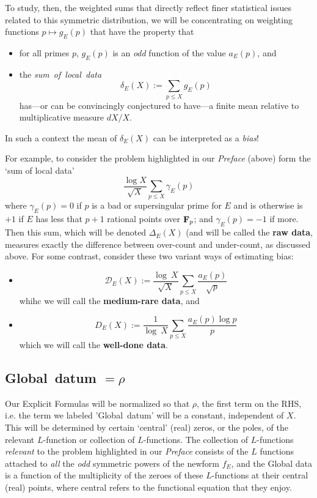 \documentclass[11pt]{article}
\theoremstyle{plain}
\theoremstyle{definition}
\numberwithin{equation}{section}
\numberwithin{figure}{section}
\numberwithin{table}{section}
\begin{document}
\vskip20pt
  To study, then, the weighted sums that directly reflect finer statistical issues related to this symmetric distribution, we will be concentrating on weighting functions $p \mapsto g_E(p)$ that have the property that \begin{itemize} \item for all primes $p$, $g_E(p)$ is an {\it odd} function of the value  $a_E(p)$, and \item the {\it sum\ of\ local\ data}  $$\delta_E(X):=\sum_{p\le X}g_E(p)$$ has---or can be convincingly conjectured to have---a finite mean  %
    relative to multiplicative measure $dX/X$.\end{itemize}  In such a context  the mean of $\delta_E(X)$ can be interpreted as a {\it bias}!


 For example, to consider  the problem highlighted in our {\it Preface} (above) form  the `sum of local data'
  $${\frac{\log X}{{\sqrt X}}}\sum_{p\le X}\gamma_E(p)$$  where $\gamma_E(p)=0$ if $p$ is a bad or supersingular prime for $E$ and is otherwise is $+1$ if $E$ has less that $p+1$ rational points over ${\bf F}_p$; and $\gamma_E(p) = -1$ if more.  Then this sum, which will be denoted $\Delta_E(X)$ (and will be called the {\bf raw data}, measures exactly the difference between over-count and under-count, as discussed above.  For some contrast, consider these two variant ways of estimating bias:
  \begin{itemize}
 \item   $${\mathcal D}_E(X):= {\frac{\log\ X}{\sqrt X}}\sum_{p \le X}{\frac{a_E(p)}{\sqrt p}}$$  whihc we will call  the {\bf medium-rare data}, and \item
  $${D}_E(X):= {\frac{1}{\log\ X}}\sum_{p \le X}{\frac{a_E(p)\log p}{ p}}$$  which we will call the {\bf well-done data}.
  \end{itemize}\vskip10pt


\subsection{ Global\ datum $ =\rho$ }

Our Explicit Formulas will be normalized so that $\rho$, the first  term on the RHS, i.e. the term we labeled 'Global\ datum' will be a constant, independent of $X$. This will be   determined by  certain `central'  (real)  zeros, or the poles, of the relevant $L$-function or collection of $L$-functions. The   collection of $L$-functions {\it relevant} to the problem highlighted in our {\it Preface} consists of  the $L$ functions attached to {\it all}  the {\it odd} symmetric powers of the newform $f_E$, and the Global data is a function of the multiplicity of the zeroes of these $L$-functions at their central (real) points, where central refers to the functional equation that they enjoy.
\end{document}
